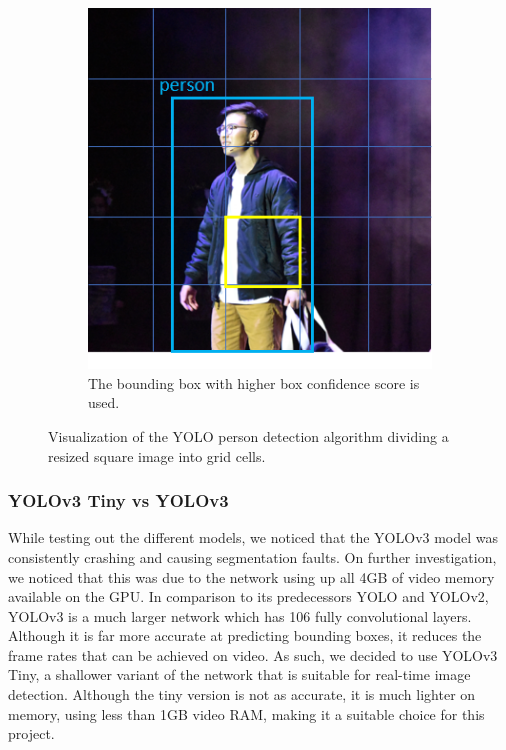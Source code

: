 \begin{figure}[ht]
\begin{subfigure}[b]{.45\textwidth}
		\includegraphics[width=1.0\linewidth]{img/chapter5_implementation/yoloAlgo.png}
		\caption{The bounding box with higher box confidence score is used.}
	\end{subfigure}
	\vspace{-1\baselineskip}
	\begin{center}
		\caption{Visualization of the YOLO person detection algorithm dividing a resized square image into grid cells.}
		\label{fig:yoloViz}
	\end{center}
	\vspace{-2\baselineskip}
\end{figure}

\subsubsection{YOLOv3 Tiny vs YOLOv3}
While testing out the different models, we noticed that the YOLOv3 model was consistently crashing and causing segmentation faults. On further investigation, we noticed that this was due to the network using up all 4GB of video memory available on the GPU. In comparison to its predecessors YOLO and YOLOv2, YOLOv3 is a much larger network which has 106 fully convolutional layers. Although it is far more accurate at predicting bounding boxes, it reduces the frame rates that can be achieved on video. As such, we decided to use YOLOv3 Tiny, a shallower variant of the network that is suitable for real-time image detection. Although the tiny version is not as accurate, it is much lighter on memory, using less than 1GB video RAM, making it a suitable choice for this project.

